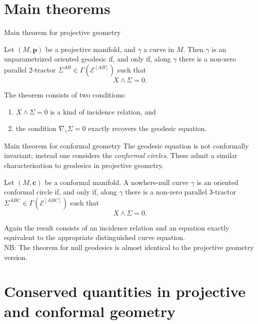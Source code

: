 \documentclass[handout]{beamer}
\begin{document}
\section{Main theorems}

\begin{frame}{Main theorem for projective geometry}
  \begin{Theorem}
    Let \( (M,\bm{p}) \) be a projective manifold, and \( \gamma \) a curve in \(
    M \).
    Then \( \gamma \) is an unparametrized oriented geodesic if, and only if,
    along \( \gamma \) there is a non-zero parallel 2-tractor \( \Sigma^{A B}\in
    \Gamma\left( \mathcal{E}^{ [A B] }\right) \) such that
    \[
      X \wedge \Sigma = 0.
    \]
  \end{Theorem}
  \pause
  The theorem consists of two conditions:\\
  \begin{enumerate}
    \pause
    \item \( X \wedge \Sigma = 0\) is a kind of incidence relation, and
    \pause
    \item the condition \( \nabla_{\dot{\gamma}} \Sigma = 0 \) exactly recovers the geodesic equation.
  \end{enumerate}
\end{frame}

\begin{frame}{Main theorem for conformal geometry}
  The geodesic equation is not conformally invariant; instead one considers the
  \emph{conformal circles}.
  These admit a similar characterisation to geodesics in projective geometry.
  \pause
  \begin{Theorem}
    Let \( (M,\bm{c}) \) be a conformal manifold.
    A nowhere-null curve \( \gamma \) is an oriented conformal circle if, and
    only if, along \( \gamma \) there is a non-zero parallel 3-tractor \(
    \Sigma^{ABC} \in \Gamma(\mathcal{E}^{[ABC]}) \) such that
    \[
      X \wedge \Sigma = 0.
    \]
  \end{Theorem}
  \pause
  Again the result consists of an incidence relation and an equation exactly
  equivalent to the appropriate distinguished curve equation.
  \pause
  \hspace{1em}\\
  NB: The theorem for null geodesics is almost identical to the projective geometry version.
\end{frame}

\section{Conserved quantities in projective and conformal geometry}
\end{document}
